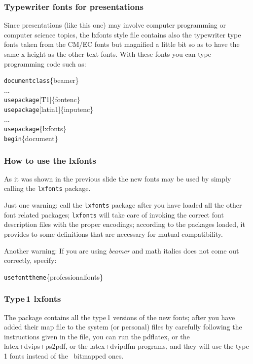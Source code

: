 \documentclass{beamer}
\newcommand*\cs[1]{\texttt{\char92#1}}
\begin{document}
\begin{frame}\frametitle{Typewriter fonts for presentations}
Since presentations (like this one) may involve computer programming or computer science topics, the lxfonts style file contains also the typewriter type fonts taken from the CM/EC fonts but magnified a little bit so as to have the same x-height as the other text fonts. With these fonts you can type programming code such as:
\begin{flushleft}\ttfamily
\cs{documentclass}\{beamer\}\\
...\\
\cs{usepackage}[T1]\{fontenc\}\\
\cs{usepackage}[latin1]\{inputenc\}\\
...\\
\cs{usepackage}\{lxfonts\}\\
\cs{begin}\{document\}
\end{flushleft}
\end{frame}



\begin{frame}\frametitle{How to use the lxfonts}
As it was shown in the previous slide the new fonts may be used by simply calling the \texttt{lxfonts} package.

\alert{Just one warning}: call the \texttt{lxfonts} package after you have loaded all the other font related packages; \texttt{lxfonts} will take care of invoking the correct font description files with the proper encodings; according to the packages loaded, it provides to some definitions that are necessary for mutual compatibility.

\alert{Another warning}: If you are using \textsl{beamer} and math italics does not come out correctly, specify:
\begin{flushleft}\ttfamily
\cs{usefonttheme}\{professionalfonts\}
\end{flushleft}
\end{frame}


\begin{frame}\frametitle{Type\,1 lxfonts}
The package contains all the type\,1 versions of the new fonts; after you have added their map file to the system (or personal) files by carefully following the instructions given in the  file, you can run the \alert{pdflatex}, or the \alert{latex+dvips+ps2pdf}, or the \alert{latex+dvipdfm} programs, and they will use the \alert{type\,1} fonts instead of the \MF\ bitmapped ones.
\end{frame}
\end{document}
